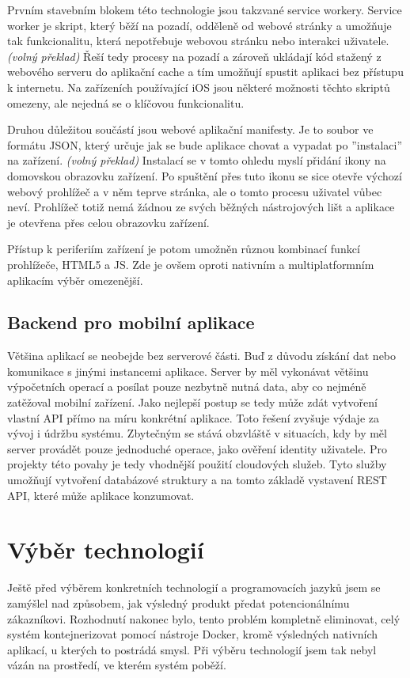 \documentclass[
  biblatex,
  glossaries,
  index
]{kidiplom}
\begin{document}
Prvním stavebním blokem této technologie jsou takzvané service workery. Service worker je skript, který běží na pozadí, odděleně od webové stránky a umožňuje tak funkcionalitu, která nepotřebuje webovou stránku nebo interakci uživatele. \cite{6} \textit{(volný překlad)} Řeší tedy procesy na pozadí a zároveň ukládají kód stažený z webového serveru do aplikační cache a tím umožňují spustit aplikaci bez přístupu k internetu. Na zařízeních používající iOS jsou některé možnosti těchto skriptů omezeny, ale nejedná se o klíčovou funkcionalitu.

Druhou důležitou součástí jsou webové aplikační manifesty. Je to soubor ve formátu JSON, který určuje jak se bude aplikace chovat a vypadat po ''instalaci'' na zařízení. \cite{7} \textit{(volný překlad)} Instalací se v tomto ohledu myslí přidání ikony na domovskou obrazovku zařízení. Po spuštění přes tuto ikonu se sice otevře výchozí webový prohlížeč a v něm teprve stránka, ale o tomto procesu uživatel vůbec neví. Prohlížeč totiž nemá žádnou ze svých běžných nástrojových lišt a aplikace je otevřena přes celou obrazovku zařízení.

Přístup k periferiím zařízení je potom umožněn různou kombinací funkcí prohlížeče, HTML5 a JS. Zde je ovšem oproti nativním a multiplatformním aplikacím výběr omezenější.

\subsection{Backend pro mobilní aplikace}
Většina aplikací se neobejde bez serverové části. Buď z důvodu získání dat nebo komunikace s jinými instancemi aplikace. Server by měl vykonávat většinu výpočetních operací a posílat pouze nezbytně nutná data, aby co nejméně zatěžoval mobilní zařízení. Jako nejlepší postup se tedy může zdát vytvoření vlastní API přímo na míru konkrétní aplikace. Toto řešení zvyšuje výdaje za vývoj i údržbu systému. Zbytečným se stává obzvláště v situacích, kdy by měl server provádět pouze jednoduché operace, jako ověření identity uživatele. Pro projekty této povahy je tedy vhodnější použití cloudových služeb. Tyto služby umožňují vytvoření databázové struktury a na tomto základě vystavení REST API, které může aplikace konzumovat.
\newpage

\section{Výběr technologií}
Ještě před výběrem konkretních technologií a programovacích jazyků jsem se zamýšlel nad způsobem, jak výsledný produkt předat potencionálnímu zákazníkovi. Rozhodnutí nakonec bylo, tento problém kompletně eliminovat, celý systém kontejnerizovat pomocí nástroje Docker, kromě výsledných nativních aplikací, u kterých to postrádá smysl. Při výběru technologií jsem tak nebyl vázán na prostředí, ve kterém systém poběží.
\end{document}
